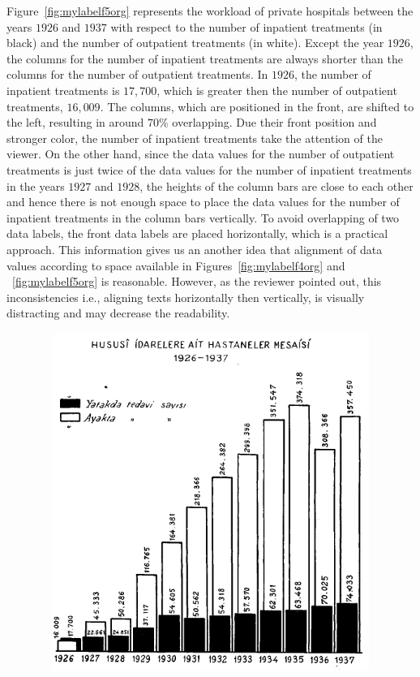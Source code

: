 Figure~\ref{fig:mylabelf5org} represents the workload of private hospitals between the years $1926$ and $1937$ with respect to the number of inpatient treatments (in black) and the number of outpatient treatments (in white). Except the year $1926$, the columns for the number of inpatient treatments are always shorter than the columns for the number of outpatient treatments. In $1926$, the number of inpatient treatments is $17,700$, which is greater then the number of outpatient treatments, $16,009$. The columns, which are positioned in the front, are shifted to the left, resulting in around $70\%$ overlapping. Due their front position and stronger color, the number of inpatient treatments take the attention of the viewer. On the other hand, since the data values for the number of outpatient treatments is just twice of the data values for the number of inpatient treatments in the years $1927$ and $1928$, the heights of the column bars are close to each other and hence there is not enough space to place the data values for the number of inpatient treatments in the column bars vertically. To avoid overlapping of  two data labels, the front data labels are placed horizontally, which is a practical approach. 
This information gives us an another idea that alignment of data values according to space available in Figures~\ref{fig:mylabelf4org} and ~\ref{fig:mylabelf5org} is reasonable. However, as the reviewer pointed out, this inconsistencies i.e., aligning texts horizontally then vertically,  is visually distracting and may decrease the readability. 


\begin{figure}[hbt!]
	\centering
	\includegraphics[width=12cm,height=11cm,keepaspectratio]{Hususi_original.png}
\end{figure}



